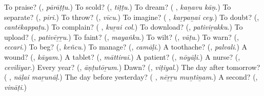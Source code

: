 \begin{tcolorbox}[breakable,colback=teal!4,colframe=teal!35!black,title={Before you move on}]
To praise? (\textbf{}, \emph{pārāṭṭu}.) To scold? (\textbf{}, \emph{tiṭṭu}.) To dream? (\textbf{ }, \emph{kaṉavu kāṇ}.) To separate? (\textbf{}, \emph{piri}.) To throw? (\textbf{}, \emph{vīcu}.) To imagine? (\textbf{ }, \emph{kaṟpaṉai cey}.) To doubt? (\textbf{}, \emph{cantēkappaṭu}.) To complain? (\textbf{ }, \emph{kuṟai col}.) To download? (\textbf{}, \emph{pativiṟakku}.) To upload? (\textbf{}, \emph{pativēṟṟu}.) To faint? (\textbf{}, \emph{mayaṅku}.) To wilt? (\textbf{}, \emph{vāṭu}.) To warn? (\textbf{}, \emph{eccari}.) To beg? (\textbf{}, \emph{keñcu}.) To manage? (\textbf{}, \emph{camāḷi}.) A toothache? (\textbf{}, \emph{palvali}.) A wound? (\textbf{}, \emph{kāyam}.) A tablet? (\textbf{}, \emph{māttirai}.) A patient? (\textbf{}, \emph{nōyāḷi}.) A nurse? (\textbf{}, \emph{ceviliyar}.) Every year? (\textbf{}, \emph{āṇṭutōṟum}.) Dawn? (\textbf{}, \emph{viṭiyal}.) The day after tomorrow? (\textbf{ }, \emph{nāḷai maṟunāḷ}.) The day before yesterday? (\textbf{ }, \emph{nēṟṟu muṉtiṉam}.) A second? (\textbf{}, \emph{vināṭi}.)
\end{tcolorbox}
